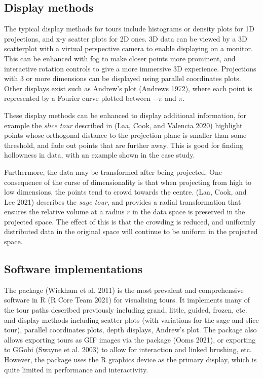 \hypertarget{display-methods}{%
\subsection{Display methods}\label{display-methods}}

The typical display methods for tours include histograms or density plots for 1D projections, and x-y scatter plots for 2D ones. 3D data can be viewed by a 3D scatterplot with a virtual perspective camera to enable displaying on a monitor. This can be enhanced with fog to make closer points more prominent, and interactive rotation controls to give a more immersive 3D experience. Projections with 3 or more dimensions can be displayed using parallel coordinates plots. Other displays exist such as Andrew's plot (Andrews 1972), where each point is represented by a Fourier curve plotted between \(-\pi\) and \(\pi\).

These display methods can be enhanced to display additional information, for example the \emph{slice tour} described in (Laa, Cook, and Valencia 2020) highlight points whose orthogonal distance to the projection plane is smaller than some threshold, and fade out points that are further away. This is good for finding hollowness in data, with an example shown in the case study.

Furthermore, the data may be transformed after being projected. One consequence of the curse of dimensionality is that when projecting from high to low dimensions, the points tend to crowd towards the centre. (Laa, Cook, and Lee 2021) describes the \emph{sage tour}, and provides a radial transformation that ensures the relative volume at a radius \(r\) in the data space is preserved in the projected space. The effect of this is that the crowding is reduced, and uniformly distributed data in the original space will continue to be uniform in the projected space.

\hypertarget{software-implementations}{%
\subsection{Software implementations}\label{software-implementations}}

The  package (Wickham et al. 2011) is the most prevalent and comprehensive software in R (R Core Team 2021) for visualising tours. It implements many of the tour paths described previously including grand, little, guided, frozen, etc. and display methods including scatter plots (with variations for the sage and slice tour), parallel coordinates plots, depth displays, Andrew's plot. The package also allows exporting tours as GIF images via the  package (Ooms 2021), or exporting to GGobi (Swayne et al. 2003) to allow for interaction and linked brushing, etc. However, the  package uses the R graphics device as the primary display, which is quite limited in performance and interactivity.

